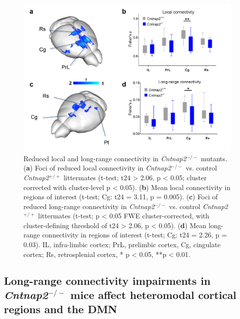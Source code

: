 \begin{figure}[th] 
    \centering
    \includegraphics[scale=0.6]{figures/cntnap2_figure_01.png}
    \decoRule
    \caption[Reduced local and long-range connectivity in \textit{Cntnap2}$^{-/-}$
    mutants.]{Reduced local and long-range connectivity in \textit{Cntnap2}$^{-/-}$ mutants.
    (\textbf{a}) Foci of reduced local connectivity in \textit{Cntnap2}$^{-/-}$ vs. control
    \textit{Cntnap2}$^{+/+}$ littermates (t-test; t24 > 2.06, p < 0.05; cluster corrected with
    cluster-level p < 0.05). (\textbf{b}) Mean local connectivity in regions of
    interest (t-test; Cg: t24 = 3.11, p = 0.005). (\textbf{c}) Foci of reduced
    long-range connectivity in \textit{Cntnap2}$^{-/-}$ vs. control \textit{Cntnap2}$^{+/+}$ littermates
    (t-test; p < 0.05 FWE cluster-corrected, with cluster-defining threshold of
    t24 > 2.06, p < 0.05). (\textbf{d}) Mean long-range connectivity in regions
    of interest (t-test; Cg: t24 = 2.26, p = 0.03). IL, infra-limbic cortex;
    PrL, prelimbic cortex, Cg, cingulate cortex; Rs, retrosplenial cortex, * p <
    0.05, **p < 0.01.}
    \label{fig:cntnap2_fig01}
\end{figure}


\subsection{Long-range connectivity impairments in \textit{Cntnap2}$^{-/-}$ mice affect
heteromodal cortical regions and the DMN}

